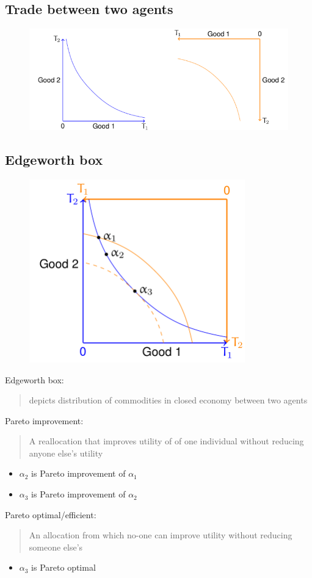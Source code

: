 \documentclass[class=report, crop=false, 12pt,a4paper]{standalone}
\begin{document}
\subsection{Trade between two agents}
\begin{figure}[H]
	\centering
	\includegraphics[width = \textwidth]{../img/figure6.png}
	\caption{}
\end{figure}
\subsection{Edgeworth box}
\begin{figure}[H]
	\centering
	\includegraphics[width =0.5 \textwidth]{../img/figure7.png}
	\caption{}
\end{figure}
Edgeworth box:
\begin{quote}
	depicts distribution of commodities in closed economy between two agents
\end{quote}
Pareto improvement:
\begin{quote}
	A reallocation that improves utility of of one individual without reducing anyone else's utility
\end{quote}
\begin{itemize}
	\item $\alpha_2$ is Pareto improvement of $\alpha_1$
	\item $\alpha_3$ is Pareto improvement of $\alpha_2$
\end{itemize}
Pareto optimal/efficient:
\begin{quote}
	An allocation from which no-one can improve utility without reducing someone else's
\end{quote}
\begin{itemize}
	\item $\alpha_3$ is Pareto optimal
\end{itemize}
\end{document}
